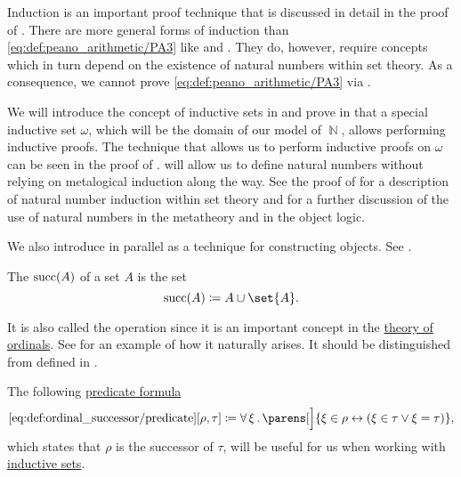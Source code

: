 \begin{remark}\label{rem:inductive_sets}
  Induction is an important proof technique that is discussed in detail in the proof of . There are more general forms of induction than \eqref{eq:def:peano_arithmetic/PA3} like  and . They do, however, require concepts which in turn depend on the existence of natural numbers within set theory. As a consequence, we cannot prove \eqref{eq:def:peano_arithmetic/PA3} via .

  We will introduce the concept of inductive sets in  and prove in  that a special inductive set \hyperref[thm:smallest_inductive_set_existence]{\( \omega \)}, which will be the domain of our model of \( \BbbN \), allows performing inductive proofs. The technique that allows us to perform inductive proofs on \( \omega \) can be seen in the proof of .  will allow us to define natural numbers without relying on metalogical induction along the way. See the proof of  for a description of natural number induction within set theory and  for a further discussion of the use of natural numbers in the metatheory and in the object logic.

  We also introduce  in parallel as a technique for constructing objects. See .
\end{remark}

\begin{definition}\label{def:ordinal_successor}
  The  \( \operatorname{succ}(A) \) of a set \( A \) is the set
  \begin{equation*}
    \op{succ}(A) \coloneqq A \cup \set{ A }.
  \end{equation*}

  It is also called the  operation since it is an important concept in the \hyperref[subsec:ordinals]{theory of ordinals}. See  for an example of how it naturally arises. It should be distinguished from  defined in .

  The following \hyperref[rem:predicate_formula]{predicate formula}
  \begin{equation*}\taglabel[\op{IsSucc}]{eq:def:ordinal_successor/predicate}
    \ref{eq:def:ordinal_successor/predicate}[\rho, \tau] \coloneqq \qforall \xi \parens[\Big]{ \xi \in \rho \leftrightarrow (\xi \in \tau \vee \xi = \tau) },
  \end{equation*}
  which states that \( \rho \) is the successor of \( \tau \), will be useful for us when working with \hyperref[def:inductive_set]{inductive sets}.
\end{definition}

